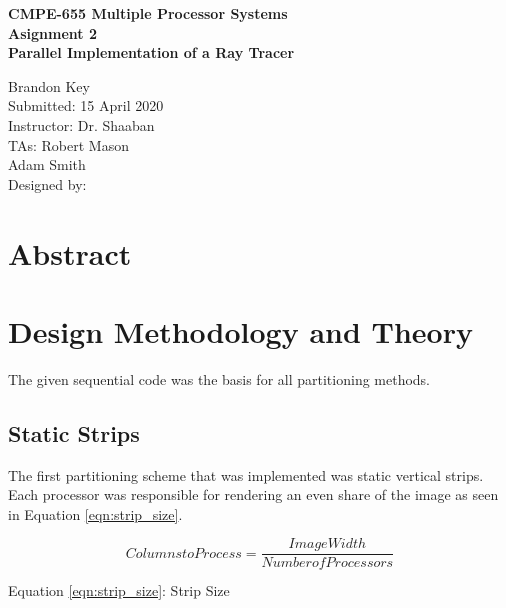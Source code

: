 \documentclass[11pt]{article}
\begin{document}
%
%

\vspace*{6 cm}

\begin{center}
\bf{CMPE-655 Multiple Processor Systems\\
    Asignment 2\\
\vspace{0.25 cm}
Parallel Implementation of a Ray Tracer
}
\end{center}

\vspace{6 cm}

\begin{flushright}
Brandon Key\\
Submitted: 15 April 2020\\
\vspace{0.5 cm}
Instructor: Dr. Shaaban\\
TAs: Robert Mason \\
Adam Smith\\
Designed by: \\
\vspace{0.5 cm}
\end{flushright}



\newpage

\section{Abstract}
	
	
	

\section{Design Methodology and Theory}

	The given sequential code was the basis for all partitioning methods. 
	

	\subsection{Static Strips}
		The first partitioning scheme that was implemented was static vertical strips. Each processor was responsible for rendering an even share of the image as seen in Equation \ref{eqn:strip_size}.
		
		\begin{equation}\label{eqn:strip_size}
			Columns to Process = \frac{Image Width}{Number of Processors}
		\end{equation}
		\begin{center}
			Equation \ref{eqn:strip_size}: Strip Size
		\end{center}
	
\end{document}
